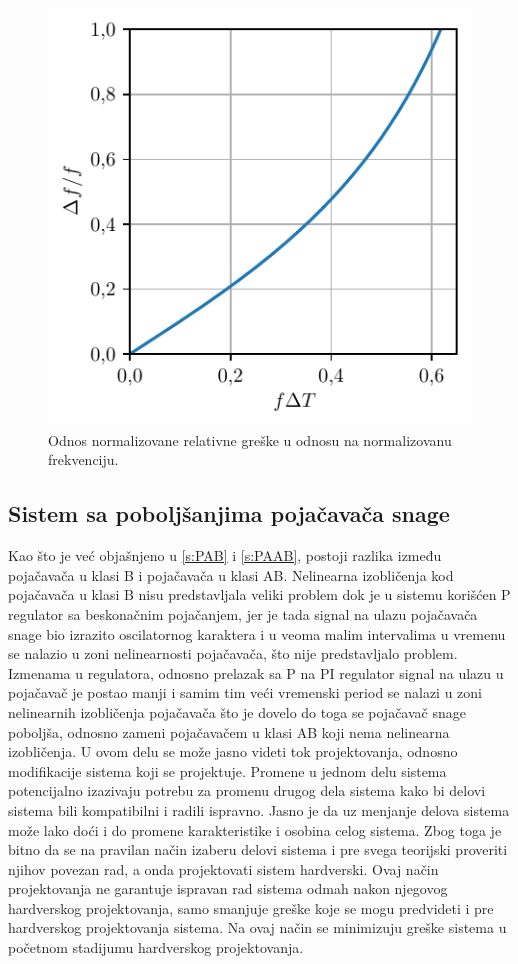 \documentclass[a4paper, 12pt, diplomski]{etf}
\begin{document}
\begin{figure}[h!]
    \centering
    \includegraphics[scale=1]{fig_teorija/fGreska.pdf}
    \caption{Odnos normalizovane relativne greške u odnosu na normalizovanu frekvenciju.}
    \label{fGreska}
\end{figure}

\break

\subsection{Sistem sa poboljšanjima pojačavača snage}

Kao što je već objašnjeno u \ref{s:PAB} i \ref{s:PAAB}, postoji razlika između pojačavača u klasi B i pojačavača u klasi AB. Nelinearna izobličenja kod pojačavača u klasi B nisu predstavljala veliki problem dok je u sistemu korišćen P regulator sa beskonačnim pojačanjem, jer je tada signal na ulazu pojačavača snage bio izrazito oscilatornog karaktera i u veoma malim intervalima u vremenu se nalazio u zoni nelinearnosti pojačavača, što nije predstavljalo problem. Izmenama u regulatora, odnosno prelazak sa P na PI regulator signal na ulazu u pojačavač je postao manji i samim tim veći vremenski period se nalazi u zoni nelinearnih izobličenja pojačavača što je dovelo do toga se pojačavač snage poboljša, odnosno zameni pojačavačem u klasi AB koji nema nelinearna izobličenja. U ovom delu se može jasno videti tok projektovanja, odnosno modifikacije sistema koji se projektuje. Promene u jednom delu sistema potencijalno izazivaju potrebu za promenu drugog dela sistema kako bi delovi sistema bili kompatibilni i radili ispravno. Jasno je da uz menjanje delova sistema može lako doći i do promene karakteristike i osobina celog sistema. Zbog toga je bitno da se na pravilan način izaberu delovi sistema i pre svega teorijski proveriti njihov povezan rad, a onda projektovati sistem hardverski. Ovaj način projektovanja ne garantuje ispravan rad sistema odmah nakon njegovog hardverskog projektovanja, samo smanjuje greške koje se mogu predvideti i pre hardverskog projektovanja sistema. Na ovaj način se minimizuju greške sistema u početnom stadijumu hardverskog projektovanja.
\end{document}
